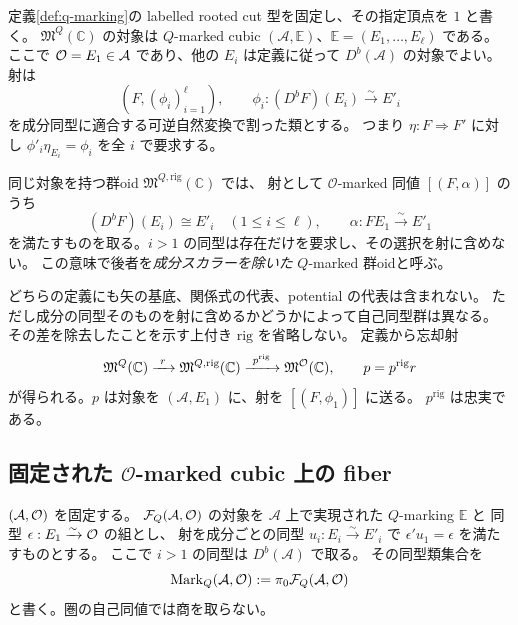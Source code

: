 \begin{definition}
\label{def:q-moduli-groupoids}
定義\ref{def:q-marking}の labelled rooted cut 型を固定し、その指定頂点を $1$ と書く。
$\mathfrak M^Q(\mathbb C)$ の対象は $Q$-marked cubic
$(\mathcal A,\mathbb E)$、$\mathbb E=(E_1,\ldots,E_\ell)$ である。
ここで $\mathcal O=E_1\in\mathcal A$ であり、他の $E_i$ は定義に従って
$D^b(\mathcal A)$ の対象でよい。
射は
\[
 (F,(\phi_i)_{i=1}^{\ell}),\qquad
 \phi_i:(D^bF)(E_i)\xrightarrow{\sim}E'_i
\]
を成分同型に適合する可逆自然変換で割った類とする。
つまり $\eta:F\Rightarrow F'$ に対し
$\phi'_i\eta_{E_i}=\phi_i$ を全 $i$ で要求する。

同じ対象を持つ群oid $\mathfrak M^{Q,\mathrm{rig}}(\mathbb C)$ では、
射として $\mathcal O$-marked 同値 $[(F,\alpha)]$ のうち
\[
 (D^bF)(E_i)\cong E'_i\quad(1\le i\le\ell),\qquad
 \alpha:F E_1\xrightarrow{\sim}E'_1
\]
を満たすものを取る。$i>1$ の同型は存在だけを要求し、その選択を射に含めない。
この意味で後者を\emph{成分スカラーを除いた} $Q$-marked 群oidと呼ぶ。
\end{definition}

どちらの定義にも矢の基底、関係式の代表、potential の代表は含まれない。
ただし成分の同型そのものを射に含めるかどうかによって自己同型群は異なる。
その差を除去したことを示す上付き $\mathrm{rig}$ を省略しない。
定義から忘却射
\begin{equation}\label{eq:q-to-o-groupoid-maps}
 \mathfrak M^Q(\mathbb C)
 \xrightarrow{\ r\ }\mathfrak M^{Q,\mathrm{rig}}(\mathbb C)
 \xrightarrow{\ p^{\mathrm{rig}}\ }\mathfrak M^{\mathcal O}(\mathbb C),
 \qquad p=p^{\mathrm{rig}}r
\end{equation}
が得られる。$p$ は対象を $(\mathcal A,E_1)$ に、射を $[(F,\phi_1)]$ に送る。
$p^{\mathrm{rig}}$ は忠実である。

\subsection{固定された $\mathcal O$-marked cubic 上の fiber}

\begin{definition}[標識の群oidと選択集合]\label{def:marking-fiber-groupoid}
$(\mathcal A,\mathcal O)$ を固定する。
$\mathcal F_Q(\mathcal A,\mathcal O)$ の対象を
$\mathcal A$ 上で実現された $Q$-marking $\mathbb E$ と
同型 $\epsilon:E_1\xrightarrow{\sim}\mathcal O$ の組とし、
射を成分ごとの同型 $u_i:E_i\xrightarrow{\sim}E'_i$ で
$\epsilon'u_1=\epsilon$ を満たすものとする。
ここで $i>1$ の同型は $D^b(\mathcal A)$ で取る。
その同型類集合を
\[
 \operatorname{Mark}_Q(\mathcal A,\mathcal O)
 :=\pi_0\mathcal F_Q(\mathcal A,\mathcal O)
\]
と書く。圏の自己同値では商を取らない。
\end{definition}

